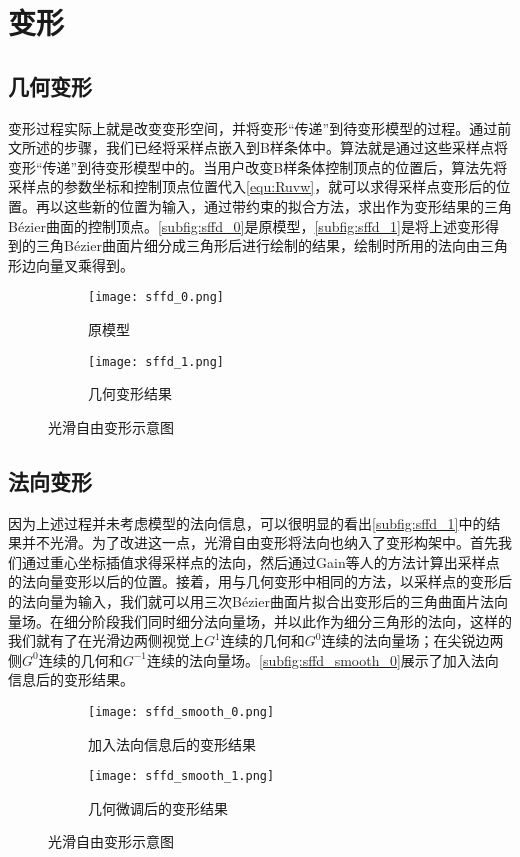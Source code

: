 \section{变形}
\subsection{几何变形}
变形过程实际上就是改变变形空间，并将变形“传递”到待变形模型的过程。通过前文所述的步骤，我们已经将采样点嵌入到B样条体中。算法就是通过这些采样点将变形“传递”到待变形模型中的。当用户改变B样条体控制顶点的位置后，算法先将采样点的参数坐标和控制顶点位置代入\autoref{equ:Ruvw}，就可以求得采样点变形后的位置。再以这些新的位置为输入，通过带约束的拟合方法，求出作为变形结果的三角Bézier曲面的控制顶点。\autoref{subfig:sffd_0}是原模型，\autoref{subfig:sffd_1}是将上述变形得到的三角Bézier曲面片细分成三角形后进行绘制的结果，绘制时所用的法向由三角形边向量叉乘得到。

\begin{figure}[htbp]
	\centering
	\begin{subfigure}[b]{.4\textwidth}
		\centering
		\texttt{[image: sffd\_0.png]}
		\caption{原模型}\label{subfig:sffd_0}
	\end{subfigure}
	\quad
	\begin{subfigure}[b]{.4\textwidth}
		\centering
		\texttt{[image: sffd\_1.png]}
		\caption{几何变形结果}\label{subfig:sffd_1}
	\end{subfigure}
    \caption{光滑自由变形示意图}\label{fig:sffd}
\end{figure}

\subsection{法向变形}
因为上述过程并未考虑模型的法向信息，可以很明显的看出\autoref{subfig:sffd_1}中的结果并不光滑。为了改进这一点，光滑自由变形将法向也纳入了变形构架中。首先我们通过重心坐标插值求得采样点的法向，然后通过Gain等人\cite{gain1999}的方法计算出采样点的法向量变形以后的位置。接着，用与几何变形中相同的方法，以采样点的变形后的法向量为输入，我们就可以用三次Bézier曲面片拟合出变形后的三角曲面片法向量场。在细分阶段我们同时细分法向量场，并以此作为细分三角形的法向，这样的我们就有了在光滑边两侧视觉上$G^1$连续的几何和$G^0$连续的法向量场；在尖锐边两侧$G^0$连续的几何和$G^{-1}$连续的法向量场。\autoref{subfig:sffd_smooth_0}展示了加入法向信息后的变形结果。

\begin{figure}[htbp]
	\centering
	\begin{subfigure}[b]{.4\textwidth}
		\centering
		\texttt{[image: sffd\_smooth\_0.png]}
		\caption{加入法向信息后的变形结果}\label{subfig:sffd_smooth_0}
	\end{subfigure}
	\quad
	\begin{subfigure}[b]{.4\textwidth}
		\centering
		\texttt{[image: sffd\_smooth\_1.png]}
		\caption{几何微调后的变形结果}\label{subfig:sffd_smooth_1}
	\end{subfigure}
    \caption{光滑自由变形示意图}\label{fig:sffd}
\end{figure}

